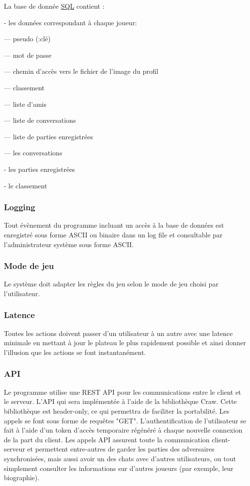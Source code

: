 \documentclass[french, utf8]{article}
\begin{document}
La base de donnée \href{https://en.wikipedia.org/wiki/SQL}{SQL} contient :
\item- les données correspondant à chaque joueur:
\item--- pseudo (:clé)
\item--- mot de passe %
\item--- chemin d'accès vers le fichier de l'image du profil
\item--- classement
\item--- liste d'amis
\item--- liste de conversations
\item--- liste de parties enregistrées

\item--- les conversations
\item- les parties enregistrées
\item- le classement

\subsubsection{Logging}
\label{sec:Logging}
Tout évènement du programme incluant un accès à la base de données est enregistré sous forme ASCII ou binaire dans un log file et consultable par l'administrateur système sous forme ASCII.

\subsubsection{Mode de jeu}
Le système doit adapter les règles du jeu selon le mode de jeu choisi par l'utilisateur.

\subsubsection{Latence}
Toutes les actions doivent passer d’un utilisateur à un autre avec une latence minimale en mettant à jour le plateau le plus rapidement possible et ainsi donner l'illusion que les actions se font instantanément.

\subsubsection{API}
Le programme utilise une REST API pour les communications entre le client et le serveur. L'API qui sera implémentée à l'aide de la bibliothèque Craw. Cette bibliothèque est header-only, ce qui permettra de faciliter la portabilité.
Les appels se font sous forme de requêtes "GET".
L'authentification de l'utilisateur se fait à l'aide d'un token d'accès temporaire régénéré à chaque nouvelle connexion de la part du client.
Les appels API assurent toute la communication client-serveur et permettent entre-autres de garder les parties des adversaires synchronisées, mais aussi avoir un des chats avec d'autres utilisateurs, ou tout simplement consulter les informations sur d'autres joueurs (par exemple, leur biographie).
\end{document}
